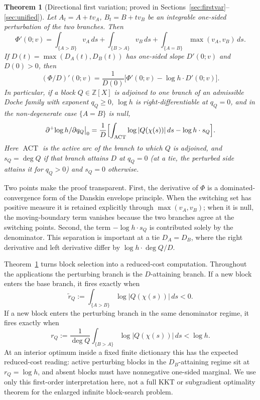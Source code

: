 \documentclass[11pt,reqno]{amsart}
\theoremstyle{plain}
\newtheorem{theorem}{Theorem}
\theoremstyle{definition}
\theoremstyle{remark}
\newcommand{\Z}{\mathbb{Z}}
\newcommand{\dplus}{\partial^{+}}
\newcommand{\dA}{D_A}
\newcommand{\dB}{D_B}
\DeclareMathOperator{\ACT}{ACT}
\begin{document}
\begin{theorem}[Directional first variation; proved in Sections~\ref{sec:firstvar}--\ref{sec:unified}]
\label{thm:main}
Let $A_t=A+t v_A$, $B_t=B+t v_B$ be an integrable one-sided perturbation of the two
branches.  Then
\[
  \Phi'(0;v)=
  \int_{\{A>B\}}v_A\,ds+\int_{\{B>A\}}v_B\,ds
  +\int_{\{A=B\}}\max(v_A,v_B)\,ds .
\]
If $D(t)=\max(D_A(t),D_B(t))$ has one-sided slope $D'(0;v)$ and $D(0)>0$, then
\[
  (\Phi/D)'(0;v)=\frac{1}{D(0)}
  \bigl[\Phi'(0;v)-\log h\cdot D'(0;v)\bigr].
\]
In particular, if a block $Q\in\Z[X]$ is adjoined to one branch of an admissible Doche
family with exponent $q_Q\ge0$, $\log h$ is right-differentiable at $q_Q=0$, and in the
non-degenerate case $\{A=B\}$ is null,
\begin{equation}\label{eq:main}
  \dplus\!\log h/\partial q_Q\big|_0
  =\frac1D\Bigl[\int_{\ACT}\log|Q(\chi(s))|\,ds-\log h\cdot s_Q\Bigr].
\end{equation}
Here $\ACT$ is the active arc of the branch to which $Q$ is adjoined, and
$s_Q=\deg Q$ if that branch attains $D$ at $q_Q=0$ (at a tie, the perturbed side attains
it for $q_Q>0$) and $s_Q=0$ otherwise.
\end{theorem}

Two points make the proof transparent.  First, the derivative of $\Phi$ is a
dominated-convergence form of the Danskin envelope principle.  When the switching set
has positive measure it is retained explicitly through $\max(v_A,v_B)$; when it is
null, the moving-boundary term vanishes because the two branches agree at the switching
points.  Second, the term $-\log h\cdot s_Q$ is contributed solely by the denominator.
This separation is important at a tie $\dA=\dB$, where the right derivative and left
derivative differ by $\log h\cdot\deg Q/D$.

Theorem~\ref{thm:main} turns block selection into a reduced-cost computation.
Throughout the applications the perturbing branch is the $D$-attaining branch.  If a
new block enters the base branch, it fires exactly when
\begin{equation}\label{eq:intro-base-test}
  \widetilde r_Q:=\int_{\{A>B\}}\log|Q(\chi(s))|\,ds<0.
\end{equation}
If a new block enters the perturbing branch in the same denominator regime, it fires
exactly when
\begin{equation}\label{eq:intro-pert-test}
  r_Q:=\frac1{\deg Q}\int_{\{B>A\}}\log|Q(\chi(s))|\,ds<\log h.
\end{equation}
At an interior optimum inside a fixed finite dictionary this has the expected
reduced-cost reading: active perturbing blocks in the $D_B$-attaining regime sit at
$r_Q=\log h$, and absent blocks must have nonnegative one-sided marginal.  We use only
this first-order interpretation here, not a full KKT or subgradient optimality theorem
for the enlarged infinite block-search problem.
\end{document}

